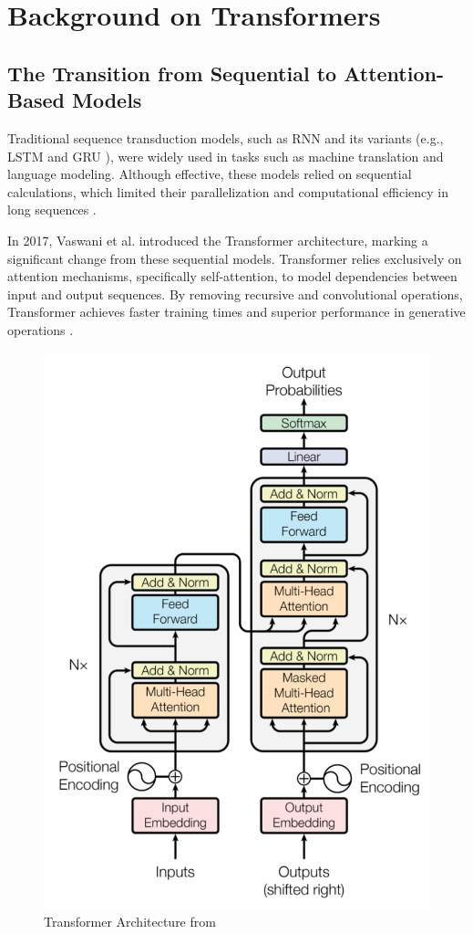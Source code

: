 \cleardoublepage
\label{chap:back}

\section{Background on Transformers} \subsection{The Transition from Sequential to Attention-Based Models}  
Traditional sequence transduction models, such as \ac{RNN} and its variants (e.g., \ac{LSTM} \cite{hochreiter1997lstm} and \ac{GRU} \cite{cho2014gru}), were widely used in tasks such as machine translation and language modeling. Although effective, these models relied on sequential calculations, which limited their parallelization and computational efficiency in long sequences \cite{vaswani2017attention}.

In 2017, Vaswani et al. introduced the Transformer architecture, marking a significant change from these sequential models. Transformer relies exclusively on attention mechanisms, specifically self-attention, to model dependencies between input and output sequences. By removing recursive and convolutional operations, Transformer achieves faster training times and superior performance in generative operations \cite{vaswani2017attention}.

\begin{figure}[H]
    \centering
    \centering
    \includegraphics[width=0.45\linewidth]{Images/Transformer_architecture3.png}
    \caption{Transformer Architecture from\cite{vaswani2017attention}}
    \label{fig:Tranformer}
\end{figure}
